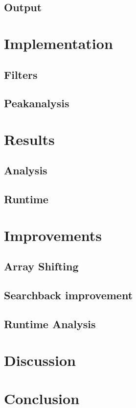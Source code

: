 \documentclass[12pt, danish, a4paper, titlepage]{article}
\begin{document}
		\subsection{Output}
		
	\section{Implementation}
		\subsection{Filters}
		\subsection{Peakanalysis}
		
	\section{Results}
		\subsection{Analysis}
		\subsection{Runtime}
		
	\section{Improvements}
		\subsection{Array Shifting}
		\subsection{Searchback improvement}
		\subsection{Runtime Analysis}
		
	\section{Discussion}
	
	\section{Conclusion}		
		
	
\end{document}
